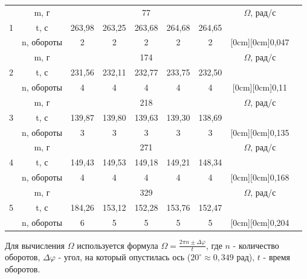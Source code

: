 \documentclass{article}
\begin{document}
\begin{table}[h]
    \centering
    \begin{tabular}{|c|c|c|c|c|c|c|c|c|}
        \hline
              & m, г & \multicolumn{5}{|c|}{77} & $\Omega$, рад/с\\
        \cline{2-8}
            1 &       t, с      & 263,98 & 263,25 & 263,68 & 264,68 & 264,65 & \\
              &    n, обороты   &    2   &    2   &    2   &    2   &    2   & \raisebox{1.5ex}[0cm][0cm]{0,047}\\
        \hline
              & m, г & \multicolumn{5}{|c|}{174} & $\Omega$, рад/с\\
        \cline{2-8}
            2 &       t, с      & 231,56 & 232,11 & 232,77 & 233,75 & 232,50 & \\
              &    n, обороты   &    4   &    4   &    4   &    4   &    4   & \raisebox{1.5ex}[0cm][0cm]{0,11}\\
        \hline
              & m, г & \multicolumn{5}{|c|}{218} & $\Omega$, рад/с\\
        \cline{2-8}
            3 &       t, с      & 139,87 & 139,80 & 139,63 & 139,30 & 138,69 & \\
              &    n, обороты   &    3   &    3   &    3   &    3   &    3   & \raisebox{1.5ex}[0cm][0cm]{0,135}\\
        \hline
              & m, г & \multicolumn{5}{|c|}{271} & $\Omega$, рад/с\\
        \cline{2-8}
            4 &       t, с      & 149,43 & 149,53 & 149,18 & 149,21 & 148,34 & \\
              &    n, обороты   &    4   &    4   &    4   &    4   &    4   & \raisebox{1.5ex}[0cm][0cm]{0,168}\\
        \hline
              & m, г & \multicolumn{5}{|c|}{329} & $\Omega$, рад/с\\
        \cline{2-8}
            5 &       t, с      & 184,26 & 153,12 & 152,28 & 153,76 & 152,47 & \\
              &    n, обороты   &    6   &    5   &    5   &    5   &    5   & \raisebox{1.5ex}[0cm][0cm]{0,204}\\
        \hline
    \end{tabular}
\end{table}

\noindent
Для вычисления $\Omega$ используется формула $\Omega = \frac{2\pi n\pm \Delta\varphi}{t}$, где $n$ - количество оборотов, $\Delta\varphi$ - угол, на который опустилась ось ($20^\circ \approx 0,349$ рад), $t$ - время оборотов.
\end{document}
